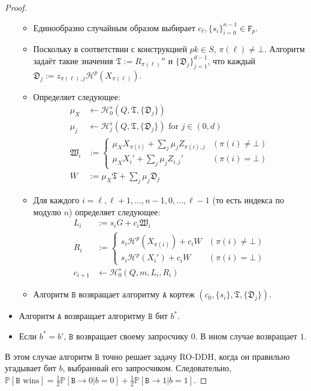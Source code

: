 \documentclass{llncs}
\newcommand{\A}{\texttt{A}}
\newcommand{\B}{\texttt{B}}
\newcommand{\F}{\texttt{F}_p}
\newcommand{\Hp}{\mathcal{H}^p}
\newcommand{\Hs}{\mathcal{H}^s}
\newcommand{\prob}{\mathbb{P}}
\begin{document}
\begin{proof}
\begin{itemize}
\begin{itemize}
\item Единообразно случайным образом выбирает $c_{\ell}, \{s_i\}_{i=0}^{n-1} \in \F$.
\item Поскольку в соответствии с конструкцией $pk \in S$, $\pi(\ell) \neq \bot$. Алгоритм задаёт такие значения $\mathfrak{T} := R_{\pi(\ell)}''$ и $\{\mathfrak{D}_j\}_{j=1}^{d-1}$, что каждый $\mathfrak{D}_j := z_{\pi(\ell),j}\Hp(X_{\pi(\ell)})$.
\item Определяет следующее:
\begin{align*}
\mu_X &\leftarrow \Hs_0(Q,\mathfrak{T},\{\mathfrak{D}_j\}) \\
\mu_j &\leftarrow \Hs_j(Q,\mathfrak{T},\{\mathfrak{D}_j\}) \text{ for } j \in (0,d) \\
\mathfrak{W}_i &:= \begin{cases} \mu_XX_{\pi(i)} + \sum_j \mu_jZ_{\pi(i),j} & (\pi(i) \neq \bot) \\ \mu_XX_i' + \sum_j \mu_jZ_{i,j}' & (\pi(i) = \bot) \end{cases} \\
W &:= \mu_X\mathfrak{T} + \sum_j \mu_j\mathfrak{D}_j
\end{align*}
\item Для каждого $i = \ell,\ell+1,\ldots,n-1,0,\ldots,\ell-1$ (то есть индекса по модулю $n$) определяет следующее:
\begin{align*}
L_i &:= s_iG + c_i\mathfrak{W}_i \\
R_i &:= \begin{cases} s_i\Hp(X_{\pi(i)}) + c_iW & (\pi(i) \neq \bot) \\ s_i\Hp(X_i') + c_iW & (\pi(i) = \bot) \end{cases} \\
c_{i+1} &\leftarrow \Hs_0(Q,m,L_i,R_i)
\end{align*}
\item Алгоритм $\B$ возвращает алгоритму $\A$ кортеж $(c_0,\{s_i\},\mathfrak{T},\{\mathfrak{D}_j\})$.
\end{itemize}
\item Алгоритм $\A$ возвращает алгоритму $\B$ бит $b^*$.
\item Если $b^* = b'$, $\B$ возвращает своему запросчику $0$. В ином случае возвращает $1$.
\end{itemize}

В этом случае алгоритм $\B$ точно решает задачу RO-DDH, когда он правильно угадывает бит $b$, выбранный его запросчиком. Следовательно, \linebreak $\prob[\B \text{ wins}] = \frac{1}{2}\prob[\B \to 0 | b = 0] + \frac{1}{2}\prob[\B \to 1 | b = 1]$.


\end{proof}
\end{document}
